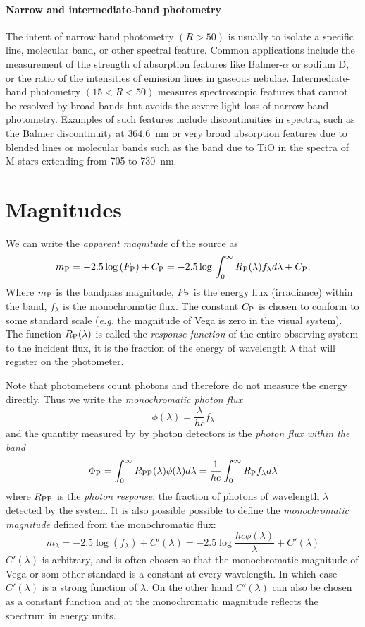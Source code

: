 \paragraph{Narrow and intermediate-band photometry} The intent of
narrow band photometry $(R>50)$ is usually to isolate a specific line,
molecular band, or other spectral feature. Common applications include
the measurement of the strength of absorption features like
Balmer-$\alpha$ or sodium D, or the ratio of the intensities of
emission lines in gaseous nebulae. Intermediate-band photometry
$(15<R<50)$ measures spectroscopic features that cannot be resolved by
broad bands but avoids the severe light loss of narrow-band
photometry. Examples of such features include discontinuities in
spectra, such as the Balmer discontinuity at $364.6$~nm or very broad
absorption features due to blended lines or molecular bands such as
the band due to TiO in the spectra of M stars extending from 705 to
730~nm.
\section{Magnitudes}
We can write the {\it apparent magnitude} of the source as 
\[
m_{\rm P}=-2.5\log{(F_{\rm P})}+C_{\rm
  P}=-2.5\log{}\int_0^\infty R_{\rm P}(\lambda)f_\lambda
d\lambda+C_{\rm P}.
\]
Where $m_{\rm P}$ is the bandpass magnitude, $F_{\rm P}$ is the energy
flux (irradiance) within the band, $f_\lambda$ is the monochromatic
flux. The constant $C_{\rm P}$ is chosen to conform to some standard
scale ({\it e.g.} the magnitude of Vega is zero in the visual
system). The function $R_{\rm P}(\lambda)$ is called the {\it response
  function} of the entire observing system to the incident flux, it is
the fraction of the energy of wavelength $\lambda$ that will register
on the photometer.

Note that photometers count photons and therefore do not measure the
energy directly. Thus we write the {\it monochromatic photon flux} 
\[
\phi(\lambda)=\frac{\lambda}{hc}f_\lambda
\]
and the quantity measured by by photon detectors is the {\it photon
  flux within the band}
\[
\Phi_{\rm P}=\int_0^\infty R_{\rm
  PP}(\lambda)\phi(\lambda)d\lambda=\frac{1}{hc}\int_0^\infty R_{\rm
  P}f_\lambda d\lambda
\]
where $R_{\rm PP}$ is the {\it photon response}: the fraction of
photons of wavelength $\lambda$ detected by the system. It is also
possible possible to define the {\it monochromatic magnitude} defined
from the monochromatic flux:
\[
m_\lambda=-2.5\log{(f_\lambda)}+C'(\lambda)=-2.5\log{\frac{hc\phi(\lambda)}{\lambda}}+C'(\lambda)
\]
$C'(\lambda)$ is arbitrary, and is often chosen so that the
monochromatic magnitude of Vega or som other standard is a constant
at every wavelength. In which case $C'(\lambda)$ is a strong function
of $\lambda$. On the other hand $C'(\lambda)$ can also be chosen as a
constant function and at the monochromatic magnitude reflects the
spectrum in energy units. 
